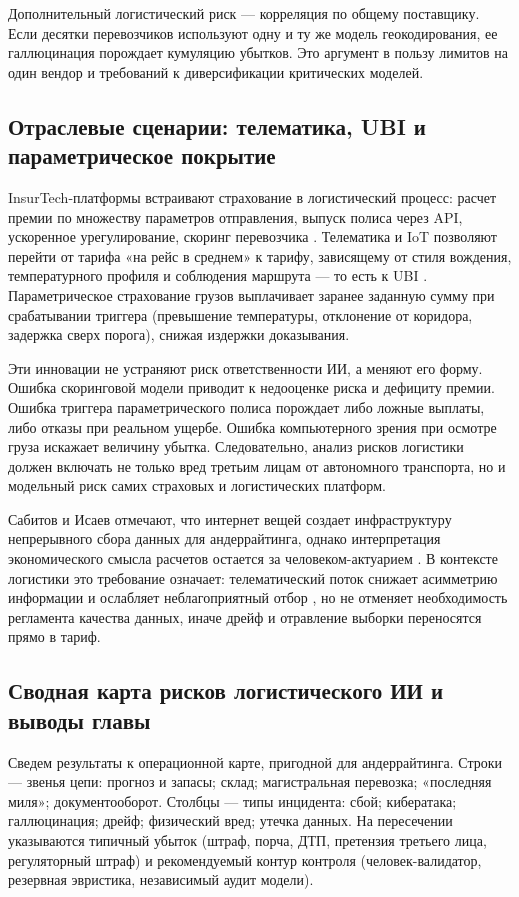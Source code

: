 \documentclass[a4paper,14pt]{extarticle}
\begin{document}
Дополнительный логистический риск --- корреляция по общему поставщику. Если десятки перевозчиков используют одну и ту же модель геокодирования, ее галлюцинация порождает кумуляцию убытков. Это аргумент в пользу лимитов на один вендор и требований к диверсификации критических моделей.

\subsection{Отраслевые сценарии: телематика, UBI и параметрическое покрытие}

InsurTech-платформы встраивают страхование в логистический процесс: расчет премии по множеству параметров отправления, выпуск полиса через API, ускоренное урегулирование, скоринг перевозчика \cite{insurtech}. Телематика и IoT позволяют перейти от тарифа «на рейс в среднем» к тарифу, зависящему от стиля вождения, температурного профиля и соблюдения маршрута --- то есть к UBI \cite{maglinova, insurtech}. Параметрическое страхование грузов выплачивает заранее заданную сумму при срабатывании триггера (превышение температуры, отклонение от коридора, задержка сверх порога), снижая издержки доказывания.

Эти инновации не устраняют риск ответственности ИИ, а меняют его форму. Ошибка скоринговой модели приводит к недооценке риска и дефициту премии. Ошибка триггера параметрического полиса порождает либо ложные выплаты, либо отказы при реальном ущербе. Ошибка компьютерного зрения при осмотре груза искажает величину убытка. Следовательно, анализ рисков логистики должен включать не только вред третьим лицам от автономного транспорта, но и модельный риск самих страховых и логистических платформ.

Сабитов и Исаев отмечают, что интернет вещей создает инфраструктуру непрерывного сбора данных для андеррайтинга, однако интерпретация экономического смысла расчетов остается за человеком-актуарием \cite{sabitov}. В контексте логистики это требование означает: телематический поток снижает асимметрию информации и ослабляет неблагоприятный отбор \cite{pindyck}, но не отменяет необходимость регламента качества данных, иначе дрейф и отравление выборки переносятся прямо в тариф.

\subsection{Сводная карта рисков логистического ИИ и выводы главы}

Сведем результаты к операционной карте, пригодной для андеррайтинга. Строки --- звенья цепи: прогноз и запасы; склад; магистральная перевозка; «последняя миля»; документооборот. Столбцы --- типы инцидента: сбой; кибератака; галлюцинация; дрейф; физический вред; утечка данных. На пересечении указываются типичный убыток (штраф, порча, ДТП, претензия третьего лица, регуляторный штраф) и рекомендуемый контур контроля (человек-валидатор, резервная эвристика, независимый аудит модели).
\end{document}
